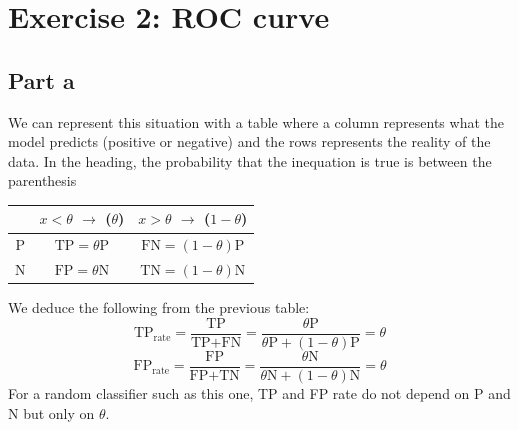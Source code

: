 \documentclass[a4paper, 10pt]{article}
\begin{document}
\section{Exercise 2: ROC curve}
\subsection{Part a}
We can represent this situation with a table where a column represents what the model predicts (positive or negative)
and the rows represents the reality of the data. In the heading, the probability that the inequation is true is between the parenthesis
\\
\begin{center}
\begin{tabular}{ |c|c|c| }
    \hline
    \  & $x<\theta$ $\rightarrow$ ($\theta$) & $x>\theta$ $\rightarrow$ ($1-\theta$) \\
    \hline
    P & $\text{TP} = \theta \text{P}$ & $\text{FN} = (1-\theta) \text{P}$ \\
    N & $\text{FP} = \theta \text{N}$ & $\text{TN} = (1-\theta) \text{N}$ \\
    \hline
\end{tabular}
\end{center}
We deduce the following from the previous table:
$$
\text{TP}_{\text{rate}} = \frac{\text{TP}}{\text{TP}+\text{FN}} = \frac{\theta \text{P}}{\theta \text{P} +(1-\theta)\text{P}} = \theta
$$
$$
\text{FP}_{\text{rate}} = \frac{\text{FP}}{\text{FP}+\text{TN}} = \frac{\theta \text{N}}{\theta \text{N} + (1-\theta)\text{N}} = \theta
$$
For a random classifier such as this one, TP and FP rate do not depend
on P and N but only on $\theta$.
\end{document}
